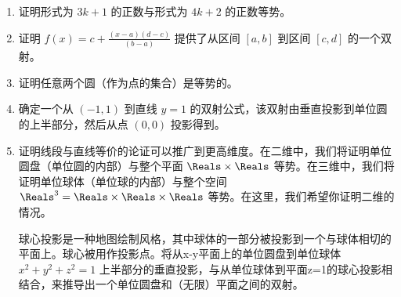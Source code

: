 \begin{enumerate}
    \item  
    证明形式为 $3k +1$ 的正数与形式为 $4k + 2$ 的正数等势。
    \wbvfill
    
    \item 
    证明 $\displaystyle f(x) =  c + \frac{(x-a)(d-c)}{(b-a)}$ 提供了从区间 $[a, b]$ 到区间 $[c, d]$ 的一个双射。
    \wbvfill
    
    \workbookpagebreak
    
    \item 
    证明任意两个圆（作为点的集合）是等势的。
    \wbvfill
    
    \item 
    确定一个从 $(-1, 1)$ 到直线 $y = 1$ 的双射公式，该双射由垂直投影到单位圆的上半部分，然后从点 $(0, 0)$ 投影得到。
    \wbvfill
    
    \workbookpagebreak
    
    \item  
    证明线段与直线等价的论证可以推广到更高维度。在二维中，我们将证明单位圆盘（单位圆的内部）与整个平面 $\Reals \times \Reals$ 等势。在三维中，我们将证明单位球体（单位球的内部）与整个空间 $\Reals^3 = \Reals \times \Reals \times \Reals$ 等势。在这里，我们希望你证明二维的情况。
    
    球心投影是一种地图绘制风格，其中球体的一部分被投影到一个与球体相切的平面上。球心被用作投影点。将从x-y平面上的单位圆盘到单位球体 $x^2 + y^2 + z^2 = 1$ 上半部分的垂直投影，与从单位球体到平面z=1的球心投影相结合，来推导出一个单位圆盘和（无限）平面之间的双射。
    \wbvfill
    
    \end{enumerate}
     
